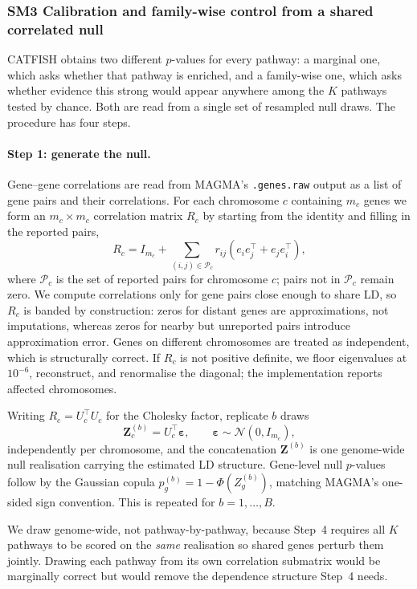 \subsubsection*{SM3 Calibration and family-wise control from a shared correlated null}

CATFISH obtains two different $p$-values for every pathway: a marginal one,
which asks whether that pathway is enriched, and a family-wise one, which asks whether evidence this strong would appear anywhere among the $K$ pathways tested by chance. Both are read from a single set of resampled null draws. The procedure has four steps.

\paragraph{Step 1: generate the null.}
Gene--gene correlations are read from MAGMA's \texttt{.genes.raw} output as a list of gene pairs and their correlations. For each chromosome $c$ containing $m_c$ genes we form an $m_c\times m_c$ correlation matrix $R_c$ by starting from the identity and filling in the reported pairs,
\[
R_c = I_{m_c} + \sum_{(i,j)\in\mathcal{P}_c}
      r_{ij}\left(e_ie_j^{\top}+e_je_i^{\top}\right),
\]
where $\mathcal{P}_c$ is the set of reported pairs for chromosome $c$; pairs not in $\mathcal{P}_c$ remain zero. We compute correlations only for gene pairs close enough to share LD, so $R_c$ is banded by construction: zeros for distant genes are approximations, not imputations, whereas zeros for nearby but unreported pairs introduce approximation error. Genes on different chromosomes are treated as independent, which is structurally correct. If $R_c$ is not positive definite, we floor eigenvalues at $10^{-6}$, reconstruct, and renormalise the diagonal; the implementation reports affected chromosomes.

Writing $R_c=U_c^{\top}U_c$ for the Cholesky factor, replicate $b$ draws
\[
\mathbf{Z}^{(b)}_c = U_c^{\top}\boldsymbol{\varepsilon},\qquad
\boldsymbol{\varepsilon}\sim\mathcal{N}(0,I_{m_c}),
\]
independently per chromosome, and the concatenation $\mathbf{Z}^{(b)}$ is one genome-wide null realisation carrying the estimated LD structure. Gene-level null $p$-values follow by the Gaussian copula $p_g^{(b)}=1-\Phi(Z_g^{(b)})$, matching MAGMA's one-sided sign convention. This is repeated for $b=1,\dots,B$.

We draw genome-wide, not pathway-by-pathway, because Step~4 requires all $K$ pathways to be scored on the \emph{same} realisation so shared genes perturb them jointly. Drawing each pathway from its own correlation submatrix would be marginally correct but would remove the dependence structure Step~4 needs.

